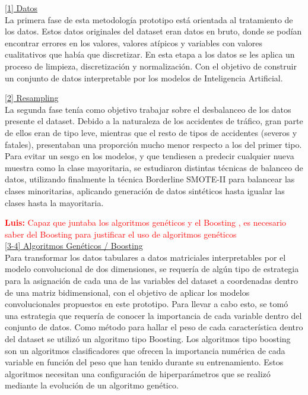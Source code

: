 \documentclass{uathesis-es}
\begin{document}
\underline{[1] Datos}\\
La primera fase de esta metodología prototipo está orientada al tratamiento de los datos. Estos datos originales del dataset eran datos en bruto, donde se podían encontrar errores en los valores, valores atípicos y variables con valores cualitativos que había que discretizar. En esta etapa a los datos se les aplica un proceso de limpieza, discretización y normalización. Con el objetivo de construir un conjunto de datos interpretable por los modelos de Inteligencia Artificial.


\underline{[2] Resampling}\\
La segunda fase tenía como objetivo trabajar sobre el desbalanceo de los datos presente el dataset. Debido a la naturaleza de los accidentes de tráfico, gran parte de ellos eran de tipo leve, mientras que el resto de tipos de accidentes (severos y fatales), presentaban una proporción mucho menor respecto a los del primer tipo. Para evitar un sesgo en los modelos, y que tendiesen a predecir cualquier nueva muestra como la clase mayoritaria, se estudiaron distintas técnicas de balanceo de datos, utilizando finalmente la técnica Borderline SMOTE-II para balancear las clases minoritarias, aplicando generación de datos sintéticos hasta igualar las clases hasta la mayoritaria.

\textcolor{red}{\textbf{Luis:} Capaz que juntaba los algoritmos genéticos y el Boosting , es necesario saber del Boosting para justificar el uso de algoritmos genéticos}\\

\underline{[3-4] Algoritmos Genéticos / Boosting}\\
Para transformar los datos tabulares a datos matriciales interpretables por el modelo convolucional de dos dimensiones, se requería de algún tipo de estrategia para la asignación de cada una de las variables del dataset a coordenadas dentro de una matriz bidimensional, con el objetivo de aplicar los modelos convolucionales propuestos en este prototipo. Para llevar a cabo esto, se tomó una estrategia que requería de conocer la importancia de cada variable dentro del conjunto de datos. Como método para hallar el peso de cada característica dentro del dataset se utilizó un algoritmo tipo Boosting. Los algoritmos tipo boosting son un algoritmos clasificadores que ofrecen la importancia numérica de cada variable en función del peso que han tenido durante su entrenamiento. Estos algoritmos necesitan una configuración de hiperparámetros que se realizó mediante la evolución de un algoritmo genético.
\end{document}
